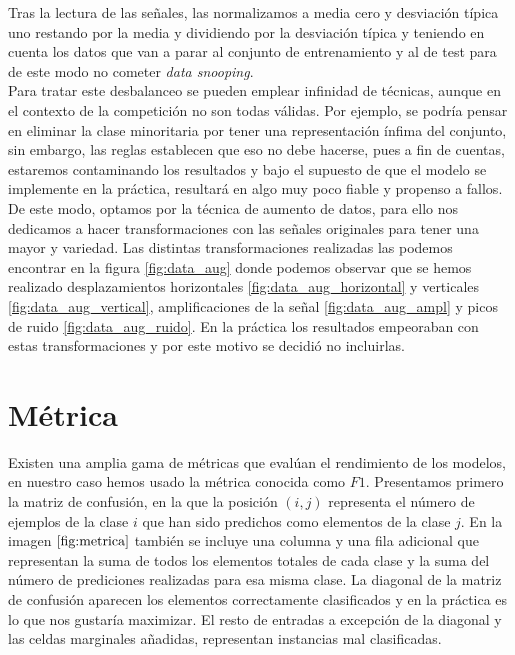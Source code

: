     
    Tras la lectura de las señales, las normalizamos a media cero y desviación típica uno restando por la media y dividiendo por la desviación típica y teniendo en cuenta los datos que van a parar al conjunto de entrenamiento y al de test para de este modo no cometer \textit{data snooping}. \\ 
    
    Para tratar este desbalanceo se pueden emplear infinidad de técnicas, aunque en el contexto de la competición no son todas válidas. Por ejemplo, se podría pensar en eliminar la clase minoritaria por tener una representación ínfima del conjunto, sin embargo, las reglas establecen que eso no debe hacerse, pues a fin de cuentas, estaremos contaminando los resultados y bajo el supuesto de que el modelo se implemente en la práctica, resultará en algo muy poco fiable y propenso a fallos. De este modo, optamos por la técnica de aumento de datos, para ello nos dedicamos a hacer transformaciones con las señales originales para tener una mayor y variedad. Las distintas transformaciones realizadas las podemos encontrar en la figura \ref{fig:data_aug} donde podemos observar que se hemos realizado desplazamientos horizontales \ref{fig:data_aug_horizontal} y verticales \ref{fig:data_aug_vertical}, amplificaciones de la señal \ref{fig:data_aug_ampl} y picos de ruido \ref{fig:data_aug_ruido}. En la práctica los resultados empeoraban con estas transformaciones y por este motivo se decidió no incluirlas. \\
    
    





\section{Métrica}
    
    Existen una amplia gama de métricas que evalúan el rendimiento de los modelos, en nuestro caso hemos usado la métrica conocida como $F1$. Presentamos primero la matriz de confusión, en la que la posición $(i,j)$ representa el número de ejemplos de la clase $i$ que han sido predichos como elementos de la clase $j$. En la imagen $\ref{fig:metrica}$ también se incluye una columna y una fila adicional que representan la suma de todos los elementos totales de cada clase y la suma del número de prediciones realizadas para esa misma clase. La diagonal de la matriz de confusión aparecen los elementos correctamente clasificados y en la práctica es lo que nos gustaría maximizar. El resto de entradas a excepción de la diagonal y las celdas marginales añadidas, representan instancias mal clasificadas.
    
